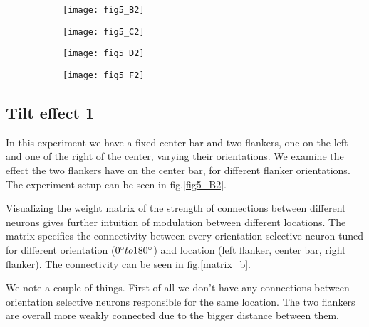\begin{figure}[H] \label{tiltexperiments}
\caption{}
\begin{subfigure}{.5\textwidth}
  \centering
  \texttt{[image: fig5\_B2]}
  \caption{}
\end{subfigure}%
\hfill
\begin{subfigure}{.5\textwidth}
  \centering
  \texttt{[image: fig5\_C2]}
  \caption{}
\end{subfigure}
\hfill
\begin{subfigure}{.5\textwidth}
  \centering
  \texttt{[image: fig5\_D2]}
  \caption{}
\end{subfigure}%
\hfill
\begin{subfigure}{.5\textwidth}
  \centering
  \texttt{[image: fig5\_F2]}
  \caption{}
\end{subfigure}
\end{figure}

\subsection{Tilt effect 1}
In this experiment we have a fixed center bar and two flankers, one on the left and one of the right of the center, varying their orientations. We examine the effect the two flankers have on the center bar, for different flanker orientations. The experiment setup can be seen in fig.\ref{fig5_B2}.

Visualizing the weight matrix of the strength of connections between different neurons gives further intuition of modulation between different locations. The matrix specifies the connectivity between every orientation selective neuron tuned for different orientation ($0\degree to 180\degree$) and location (left flanker, center bar, right flanker). The connectivity can be seen in fig.\ref{matrix_b}.


We note a couple of things. First of all we don't have any connections between orientation selective neurons responsible for the same location. The two flankers are overall more weakly connected due to the bigger distance between them.

